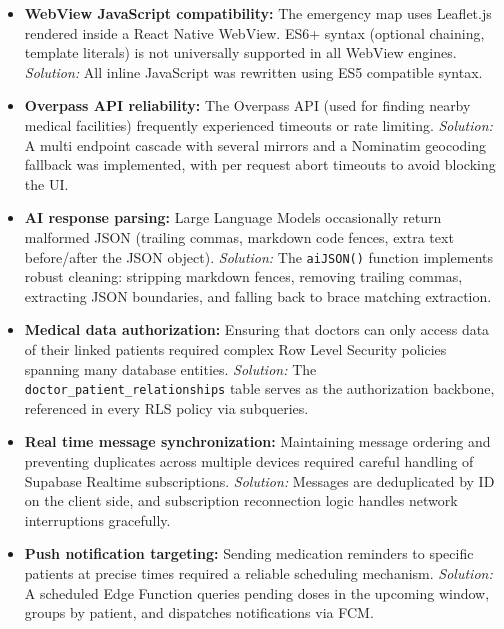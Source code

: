 \documentclass[12pt,a4paper,oneside]{report}
\begin{document}
\begin{itemize}
    \item \textbf{WebView JavaScript compatibility:} The emergency map uses Leaflet.js rendered inside a React Native WebView. ES6+ syntax (optional chaining, template literals) is not universally supported in all WebView engines. \textit{Solution:} All inline JavaScript was rewritten using ES5 compatible syntax.

    \item \textbf{Overpass API reliability:} The Overpass API (used for finding nearby medical facilities) frequently experienced timeouts or rate limiting. \textit{Solution:} A multi endpoint cascade with several mirrors and a Nominatim geocoding fallback was implemented, with per request abort timeouts to avoid blocking the UI.

    \item \textbf{AI response parsing:} Large Language Models occasionally return malformed JSON (trailing commas, markdown code fences, extra text before/after the JSON object). \textit{Solution:} The \texttt{aiJSON()} function implements robust cleaning: stripping markdown fences, removing trailing commas, extracting JSON boundaries, and falling back to brace matching extraction.

    \item \textbf{Medical data authorization:} Ensuring that doctors can only access data of their linked patients required complex Row Level Security policies spanning many database entities. \textit{Solution:} The \texttt{doctor\_patient\_relationships} table serves as the authorization backbone, referenced in every RLS policy via subqueries.

    \item \textbf{Real time message synchronization:} Maintaining message ordering and preventing duplicates across multiple devices required careful handling of Supabase Realtime subscriptions. \textit{Solution:} Messages are deduplicated by ID on the client side, and subscription reconnection logic handles network interruptions gracefully.

    \item \textbf{Push notification targeting:} Sending medication reminders to specific patients at precise times required a reliable scheduling mechanism. \textit{Solution:} A scheduled Edge Function queries pending doses in the upcoming window, groups by patient, and dispatches notifications via FCM.
\end{itemize}
\end{document}
